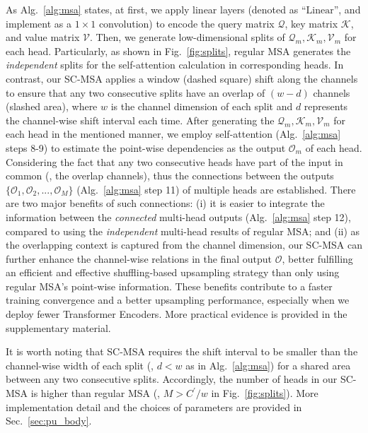 As Alg.~\ref{alg:msa} states, at first, we apply linear layers (denoted as \enquote{$\mathrm{Linear}$}, and implement as a $1\times1$ convolution) to encode the query matrix $\mathcal{Q}$, key matrix $\mathcal{K}$, and value matrix $\mathcal{V}$. Then, we generate low-dimensional splits of $\mathcal{Q}_m,\mathcal{K}_m,\mathcal{V}_m$ for each head. Particularly, as shown in Fig.~\ref{fig:splits}, regular MSA generates the \emph{independent} splits for the self-attention calculation in corresponding heads. In contrast, our SC-MSA applies a window (dashed square) shift along the channels to ensure that any two consecutive splits have an overlap of $(w-d)$ channels (slashed area), where $w$ is the channel dimension of each split and $d$ represents the channel-wise shift interval each time. After generating the $\mathcal{Q}_m,\mathcal{K}_m,\mathcal{V}_m$ for each head in the mentioned manner, we employ self-attention (Alg.~\ref{alg:msa} steps 8-9) to estimate the point-wise dependencies as the output $\mathcal{O}_m$ of each head. Considering the fact that any two consecutive heads have part of the input in common (\ie, the overlap channels), thus the connections between the outputs $\{\mathcal{O}_1, \mathcal{O}_2, ..., \mathcal{O}_M\}$ (Alg.~\ref{alg:msa} step 11) of multiple heads are established. There are two major benefits of such connections: (i) it is easier to integrate the information between the \emph{connected} multi-head outputs (Alg.~\ref{alg:msa} step 12), compared to using the \emph{independent} multi-head results of regular MSA; and (ii) as the overlapping context is captured from the channel dimension, our SC-MSA can further enhance the channel-wise relations in the final output $\mathcal{O}$, better fulfilling an efficient and effective shuffling-based upsampling strategy than only using regular MSA's point-wise information. These benefits contribute to a faster training convergence and a better upsampling performance, especially when we deploy fewer Transformer Encoders. More practical evidence is provided in the supplementary material.  

It is worth noting that SC-MSA requires the shift interval to be smaller than the channel-wise width of each split (\ie, $d<w$ as in Alg.~\ref{alg:msa}) for a shared area between any two consecutive splits. Accordingly, the number of heads in our SC-MSA is higher than regular MSA (\ie, $M > C^{\prime}/w$ in Fig.~\ref{fig:splits}). More implementation detail and the choices of parameters are provided in Sec.~\ref{sec:pu_body}.
